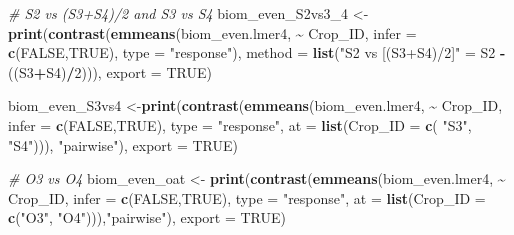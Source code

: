 \documentclass[
]{article}
\newenvironment{Shaded}{\begin{snugshade}}{\end{snugshade}}
\newcommand{\AttributeTok}[1]{\textcolor[rgb]{0.13,0.29,0.53}{#1}}
\newcommand{\CommentTok}[1]{\textcolor[rgb]{0.56,0.35,0.01}{\textit{#1}}}
\newcommand{\ConstantTok}[1]{\textcolor[rgb]{0.56,0.35,0.01}{#1}}
\newcommand{\DecValTok}[1]{\textcolor[rgb]{0.00,0.00,0.81}{#1}}
\newcommand{\FunctionTok}[1]{\textcolor[rgb]{0.13,0.29,0.53}{\textbf{#1}}}
\newcommand{\NormalTok}[1]{#1}
\newcommand{\OtherTok}[1]{\textcolor[rgb]{0.56,0.35,0.01}{#1}}
\newcommand{\SpecialCharTok}[1]{\textcolor[rgb]{0.81,0.36,0.00}{\textbf{#1}}}
\newcommand{\StringTok}[1]{\textcolor[rgb]{0.31,0.60,0.02}{#1}}
\begin{document}
\begin{Shaded}
\begin{Highlighting}[]
\CommentTok{\# S2 vs (S3+S4)/2 and S3 vs S4}
\NormalTok{biom\_even\_S2vs3\_4 }\OtherTok{\textless{}{-}} \FunctionTok{print}\NormalTok{(}\FunctionTok{contrast}\NormalTok{(}\FunctionTok{emmeans}\NormalTok{(biom\_even.lmer4, }\SpecialCharTok{\textasciitilde{}}\NormalTok{ Crop\_ID,}
                                            \AttributeTok{infer =} \FunctionTok{c}\NormalTok{(}\ConstantTok{FALSE}\NormalTok{,}\ConstantTok{TRUE}\NormalTok{),}
                                            \AttributeTok{type =} \StringTok{"response"}\NormalTok{),}
                                    \AttributeTok{method =} \FunctionTok{list}\NormalTok{(}\StringTok{"S2 vs [(S3+S4)/2]"} \OtherTok{=}\NormalTok{ S2 }\SpecialCharTok{{-}}\NormalTok{ ((S3}\SpecialCharTok{+}\NormalTok{S4)}\SpecialCharTok{/}\DecValTok{2}\NormalTok{))),}
                           \AttributeTok{export =} \ConstantTok{TRUE}\NormalTok{)}

\NormalTok{biom\_even\_S3vs4 }\OtherTok{\textless{}{-}}\FunctionTok{print}\NormalTok{(}\FunctionTok{contrast}\NormalTok{(}\FunctionTok{emmeans}\NormalTok{(biom\_even.lmer4, }\SpecialCharTok{\textasciitilde{}}\NormalTok{ Crop\_ID,}
                                         \AttributeTok{infer =} \FunctionTok{c}\NormalTok{(}\ConstantTok{FALSE}\NormalTok{,}\ConstantTok{TRUE}\NormalTok{), }
                                         \AttributeTok{type =} \StringTok{"response"}\NormalTok{, }
                                         \AttributeTok{at =} \FunctionTok{list}\NormalTok{(}\AttributeTok{Crop\_ID =} \FunctionTok{c}\NormalTok{( }\StringTok{"S3"}\NormalTok{, }\StringTok{"S4"}\NormalTok{))),  }\StringTok{"pairwise"}\NormalTok{), }
                        \AttributeTok{export =} \ConstantTok{TRUE}\NormalTok{) }

\CommentTok{\# O3 vs O4}
\NormalTok{biom\_even\_oat }\OtherTok{\textless{}{-}} \FunctionTok{print}\NormalTok{(}\FunctionTok{contrast}\NormalTok{(}\FunctionTok{emmeans}\NormalTok{(biom\_even.lmer4, }\SpecialCharTok{\textasciitilde{}}\NormalTok{ Crop\_ID, }
                                        \AttributeTok{infer =} \FunctionTok{c}\NormalTok{(}\ConstantTok{FALSE}\NormalTok{,}\ConstantTok{TRUE}\NormalTok{), }
                                        \AttributeTok{type =} \StringTok{"response"}\NormalTok{,}
                                        \AttributeTok{at =} \FunctionTok{list}\NormalTok{(}\AttributeTok{Crop\_ID =} \FunctionTok{c}\NormalTok{(}\StringTok{"O3"}\NormalTok{, }\StringTok{"O4"}\NormalTok{))),}\StringTok{"pairwise"}\NormalTok{),}
                       \AttributeTok{export =} \ConstantTok{TRUE}\NormalTok{)}


\end{Highlighting}
\end{Shaded}
\end{document}
